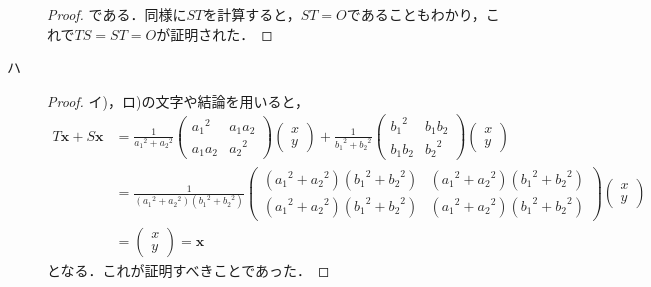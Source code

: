 \documentclass[uplatex,dvipdfmx,a4paper,11pt,fleqn]{jsarticle}
\begin{document}
\begin{leftbar}
\begin{description}
\begin{proof}
        である．同様に$ST$を計算すると，$ST=O$であることもわかり，これで$TS=ST=O$が証明された．
    \end{proof}
\item[ハ]
    \begin{proof}
    イ)，ロ)の文字や結論を用いると，
        \begin{align*}
        T \bm{x} + S \bm{x} & =
        \frac{1}{{a_1}^2+{a_2}^2}
        \begin{pmatrix}
            {a_1}^2 & a_1 a_2 \\
            a_1 a_2 & {a_2}^2
        \end{pmatrix}
        \begin{pmatrix}
            x \\
            y
        \end{pmatrix}
        +
        \frac{1}{{b_1}^2+{b_2}^2}
        \begin{pmatrix}
            {b_1}^2 & b_1 b_2 \\
            b_1 b_2 & {b_2}^2
        \end{pmatrix}
        \begin{pmatrix}
            x \\
            y
        \end{pmatrix}
        \\
        & = \frac{1}{({a_1}^2+{a_2}^2)({b_1}^2+{b_2}^2)}
        \begin{pmatrix}
            ({a_1}^2+{a_2}^2)({b_1}^2+{b_2}^2) & ({a_1}^2+{a_2}^2)({b_1}^2+{b_2}^2) \\
            ({a_1}^2+{a_2}^2)({b_1}^2+{b_2}^2) & ({a_1}^2+{a_2}^2)({b_1}^2+{b_2}^2)
        \end{pmatrix}
        \begin{pmatrix}
            x \\
            y
        \end{pmatrix}
        \\
        & =\begin{pmatrix}
            x \\
            y
        \end{pmatrix}
        =\bm{x}
    \end{align*}
    となる．これが証明すべきことであった．
\end{proof}
\end{description}
\end{leftbar}

\newpage 
\end{document}
